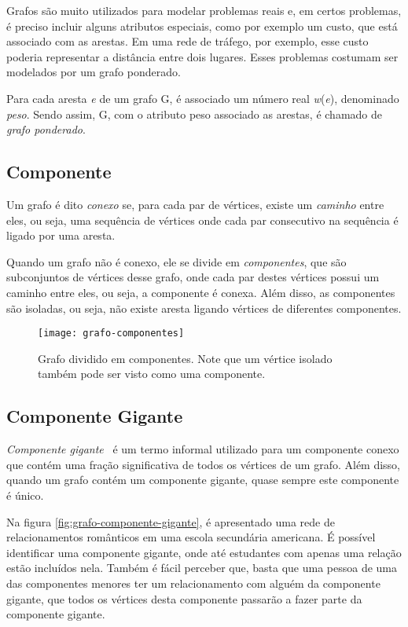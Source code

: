 Grafos são muito utilizados para modelar problemas reais e, em certos problemas, é preciso incluir alguns atributos especiais, como por exemplo um custo, que está associado com as arestas. Em uma rede de tráfego, por exemplo, esse custo poderia representar a distância entre dois lugares. Esses problemas costumam ser modelados por um grafo ponderado.

Para cada aresta \emph{e} de um grafo G, é associado um número real \emph{w}(\emph{e}), denominado \emph{peso}. Sendo assim, G, com o atributo peso associado as arestas, é chamado de \emph{grafo ponderado}.


\subsection{Componente}
\label{conceitos__grafo--componente}

Um grafo é dito \emph{conexo} se, para cada par de vértices, existe um \emph{caminho} entre eles, ou seja, uma sequência de vértices onde cada par consecutivo na sequência é ligado por uma aresta.

Quando um grafo não é conexo, ele se divide em \emph{componentes}, que são subconjuntos de vértices desse grafo, onde cada par destes vértices possui um caminho entre eles, ou seja, a componente é conexa. Além disso, as componentes são isoladas, ou seja, não existe aresta ligando vértices de diferentes componentes.

\begin{figure}[H]
\texttt{[image: grafo-componentes]}
\centering
\caption{Grafo dividido em componentes. Note que um vértice isolado também pode ser visto como uma componente.}
\end{figure}

\subsection{Componente Gigante}
\label{conceitos__grafo--componente-gigante}

\emph{Componente gigante}~\cite{easley2010networks} é um termo informal utilizado para
um componente conexo que contém uma fração significativa de todos os vértices de um grafo. Além disso, quando um grafo contém um componente gigante, quase sempre este componente é único.

Na figura \ref{fig:grafo-componente-gigante}, é apresentado uma rede de relacionamentos românticos em uma escola secundária americana. É possível identificar uma componente gigante, onde até estudantes com apenas uma relação estão incluídos nela. Também é fácil perceber que, basta que uma pessoa de uma das componentes menores ter um relacionamento com alguém da componente gigante, que todos os vértices desta componente passarão a fazer parte da componente gigante.

